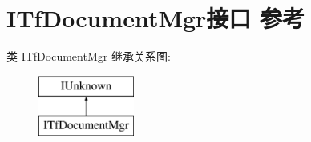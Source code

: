\hypertarget{interface_i_tf_document_mgr}{}\section{I\+Tf\+Document\+Mgr接口 参考}
\label{interface_i_tf_document_mgr}
类 I\+Tf\+Document\+Mgr 继承关系图\+:\begin{figure}[H]
\begin{center}
\leavevmode
\includegraphics[height=2.000000cm]{interface_i_tf_document_mgr}
\end{center}
\end{figure}
